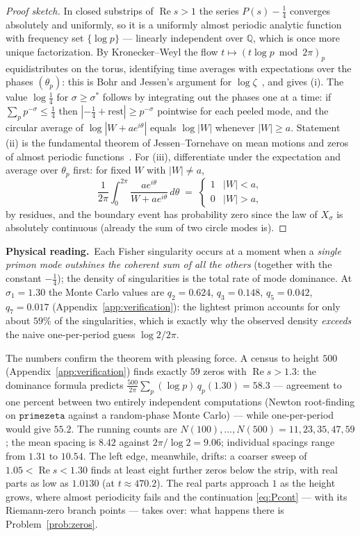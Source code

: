 \documentclass[11pt]{article}
\newcommand{\physread}{\medskip\noindent\textbf{Physical reading.}\ }
\numberwithin{equation}{section}
\theoremstyle{plain}
\theoremstyle{definition}
\theoremstyle{remark}
\begin{document}
\begin{proof}[Proof sketch]
In closed substrips of $\operatorname{Re} s > 1$ the series $P(s) - \tfrac14$
converges absolutely and uniformly, so it is a uniformly almost periodic analytic
function with frequency set $\{\log p\}$ --- linearly independent over $\mathbb{Q}$,
which is once more unique factorization. By Kronecker--Weyl the flow
$t \mapsto (t \log p \bmod 2\pi)_p$ equidistributes on the torus, identifying time
averages with expectations over the phases $(\theta_p)$: this is Bohr and Jessen's
argument for $\log\zeta$~\cite{bohrjessen}, and gives (i). The value $\log\tfrac14$
for $\sigma \ge \sigma^{*}$ follows by integrating out the phases one at a time: if
$\sum_p p^{-\sigma} \le \tfrac14$ then $|{-\tfrac14} + \text{rest}| \ge p^{-\sigma}$
pointwise for each peeled mode, and the circular average of $\log|W + a e^{i\theta}|$
equals $\log|W|$ whenever $|W| \ge a$. Statement (ii) is the fundamental theorem of
Jessen--Tornehave on mean motions and zeros of almost periodic
functions~\cite{jessentornehave}. For (iii), differentiate under the expectation and
average over $\theta_p$ first: for fixed $W$ with $|W| \neq a$,
\[
\frac{1}{2\pi}\int_0^{2\pi} \frac{a e^{i\theta}}{W + a e^{i\theta}}\, d\theta
\;=\;
\begin{cases} 1 & |W| < a, \\ 0 & |W| > a, \end{cases}
\]
by residues, and the boundary event has probability zero since the law of $X_\sigma$
is absolutely continuous (already the sum of two circle modes is).
\end{proof}

\physread Each Fisher singularity occurs at a moment when a \emph{single primon mode
outshines the coherent sum of all the others} (together with the constant
$-\tfrac14$); the density of singularities is the total rate of mode dominance. At
$\sigma_1 = 1.30$ the Monte Carlo values are $q_2 = 0.624$, $q_3 = 0.148$,
$q_5 = 0.042$, $q_7 = 0.017$ (Appendix~\ref{app:verification}): the lightest primon
accounts for only about $59\%$ of the singularities, which is exactly why the
observed density \emph{exceeds} the naive one-per-period guess $\log 2/2\pi$.

The numbers confirm the theorem with pleasing force. A census to height $500$
(Appendix~\ref{app:verification}) finds exactly $59$ zeros with
$\operatorname{Re} s > 1.3$: the dominance formula predicts
$\frac{500}{2\pi}\sum_p (\log p)\, q_p(1.30) = 58.3$ --- agreement to one percent
between two entirely independent computations (Newton root-finding on
$\texttt{primezeta}$ against a random-phase Monte Carlo) --- while one-per-period
would give $55.2$. The running counts are $N(100), \dots, N(500) = 11, 23, 35, 47,
59$; the mean spacing is $8.42$ against $2\pi/\log 2 = 9.06$; individual spacings
range from $1.31$ to $10.54$. The left edge, meanwhile, drifts: a coarser sweep of
$1.05 < \operatorname{Re} s < 1.30$ finds at least eight further zeros below the
strip, with real parts as low as $1.0130$ (at $t \approx 470.2$). The real parts
approach $1$ as the height grows, where almost periodicity fails and the continuation
\eqref{eq:Pcont} --- with its Riemann-zero branch points --- takes over: what happens
there is Problem~\ref{prob:zeros}.
\end{document}
